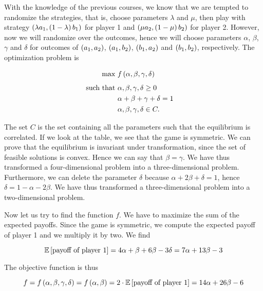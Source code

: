 With the knowledge of the previous courses, we know that we are tempted to randomize the strategies, that is, choose parameters $\lambda$ and $\mu$, then play with strategy $\parent{\lambda a_1, \parent{1 - \lambda} b_1}$ for player 1 and $\parent{\mu a_2, \parent{1 - \mu} b_2}$ for player 2. However, now we will randomize over the outcomes, hence we will choose parameters $\alpha$, $\beta$, $\gamma$ and $\delta$ for outcomes of $\parent{a_1, a_2}$, $\parent{a_1, b_2}$, $\parent{b_1, a_2}$ and $\parent{b_1, b_2}$, respectively. The optimization problem is

\begin{equation*}
    \begin{aligned}
    \underset{}{\text{max }} &
    f \parent{\alpha, \beta, \gamma, \delta} & & \\
    \text{such that  } &
        \alpha, \beta, \gamma, \delta \geq 0 & \\
        & \alpha + \beta + \gamma + \delta = 1 & \\
        & \alpha, \beta, \gamma, \delta \in C . &
    \end{aligned}
    \end{equation*}

The set $C$ is the set containing all the parameters such that the equilibrium is correlated. If we look at the table, we see that the game is symmetric. We can prove that the equilibrium is invariant under transformation, since the set of feasible solutions is convex. Hence we can say that $\beta = \gamma$. We have thus transformed a four-dimensional problem into a three-dimensional problem. Furthermore, we can delete the parameter $\delta$ because $\alpha + 2 \beta + \delta = 1$, hence $\delta = 1 - \alpha - 2 \beta$. We have thus transformed a three-dimensional problem into a two-dimensional problem.

Now let us try to find the function $f$. We have to maximize the sum of the expected payoffs. Since the game is symmetric, we compute the expected payoff of player 1 and we multiply it by two. We find

\begin{equation*}
    \mathbb{E} \squared{\text{payoff of player 1}}
    = 4 \alpha + \beta + 6 \beta - 3 \delta
    = 7 \alpha + 13 \beta - 3
\end{equation*}

The objective function is thus

\begin{equation*}
    f
    = f \parent{\alpha, \beta, \gamma, \delta}
    = f \parent{\alpha, \beta}
    = 2 \cdot \mathbb{E} \squared{\text{payoff of player 1}}
    = 14 \alpha + 26 \beta - 6
\end{equation*}



